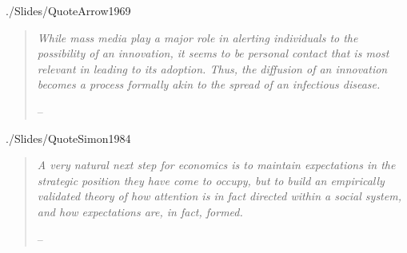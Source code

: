 {    \begin{center}
      \begin{minipage}{0.9\textwidth}
        {\footnotesize \thankstext \normalsize}
      \end{minipage}
    \end{center}
    \titlepagefinish
    \small
    \renewcommand{\listtablename}{\normalsize Tables}
    \renewcommand{\listfigurename}{\normalsize Figures}
    \listoffigures

    \medskip\medskip
    \listoftables
    \normalsize
  }

  \setcounter{page}{0}

  \begin{verbatimwrite}{./Slides/QuoteArrow1969}
    \begin{quote}
      \textit{While mass media play a major role in alerting individuals to the possibility of an innovation, it seems to be personal contact that is most relevant in leading to its adoption. Thus, the diffusion of an innovation becomes a process formally akin to the spread of an infectious disease.}

      \medskip
      \indent -- \href{https://github.com/iworld1991/EpiExp/blob/master/Literature/arrow_classificatory_1969.pdf}{\cite{arrow_classificatory_1969}}
    \end{quote}
  \end{verbatimwrite}
  

  \begin{verbatimwrite}{./Slides/QuoteSimon1984}
    \begin{quote}
      \textit{A very natural next step for economics is to maintain expectations in	the strategic position they have come to occupy, but to build an empirically validated theory of how attention is in fact directed within a social system, and how expectations are, in fact, formed.}

      \medskip
      \indent -- \href{https://econpapers.repec.org/RePEc:eee:jeborg:v:5:y:1984:i:1:p:35-55}{\cite{simon_behavioral_1984}}
    \end{quote}
  \end{verbatimwrite}
  

